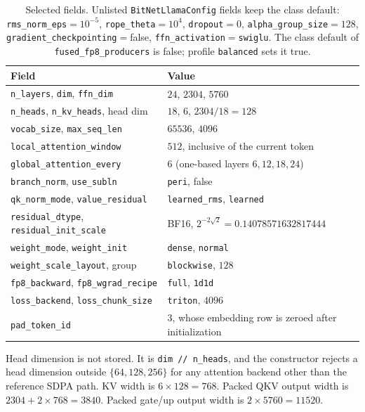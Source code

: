 \documentclass[11pt]{article}
\DeclareRobustCommand{\code}[1]{\texttt{#1}}
\begin{document}
\begin{table}[t]
\centering
\caption{Selected fields. Unlisted \code{BitNetLlamaConfig} fields keep the
class default: \code{rms\_norm\_eps}\({}=10^{-5}\),
\code{rope\_theta}\({}=10^{4}\), \code{dropout}\({}=0\),
\code{alpha\_group\_size}\({}=128\), \code{gradient\_checkpointing}\({}=\)false,
\code{ffn\_activation}\({}=\)\code{swiglu}. The class default of
\code{fused\_fp8\_producers} is false; profile \code{balanced} sets it true.}
\label{tab:geom}
\begin{tabular}{@{}ll@{}}
\toprule
Field & Value \\
\midrule
\code{n\_layers}, \code{dim}, \code{ffn\_dim} & \(24\), \(2304\), \(5760\) \\
\code{n\_heads}, \code{n\_kv\_heads}, head dim & \(18\), \(6\), \(2304/18=128\) \\
\code{vocab\_size}, \code{max\_seq\_len} & \(65536\), \(4096\) \\
\code{local\_attention\_window} & \(512\), inclusive of the current token \\
\code{global\_attention\_every} & \(6\) (one-based layers \(6,12,18,24\)) \\
\code{branch\_norm}, \code{use\_subln} & \code{peri}, false \\
\code{qk\_norm\_mode}, \code{value\_residual} & \code{learned\_rms}, \code{learned} \\
\code{residual\_dtype}, \code{residual\_init\_scale} & BF16, \(2^{-2\sqrt{2}}=0.14078571632817444\) \\
\code{weight\_mode}, \code{weight\_init} & \code{dense}, \code{normal} \\
\code{weight\_scale\_layout}, group & \code{blockwise}, \(128\) \\
\code{fp8\_backward}, \code{fp8\_wgrad\_recipe} & \code{full}, \code{1d1d} \\
\code{loss\_backend}, \code{loss\_chunk\_size} & \code{triton}, \(4096\) \\
\code{pad\_token\_id} & \(3\), whose embedding row is zeroed after initialization \\
\bottomrule
\end{tabular}
\end{table}

Head dimension is not stored. It is \code{dim // n\_heads}, and the
constructor rejects a head dimension outside \(\{64,128,256\}\) for any
attention backend other than the reference SDPA path. KV width is
\(6\times 128=768\). Packed QKV output width is
\(2304+2\times 768=3840\). Packed gate/up output width is \(2\times 5760=11520\).
\end{document}

